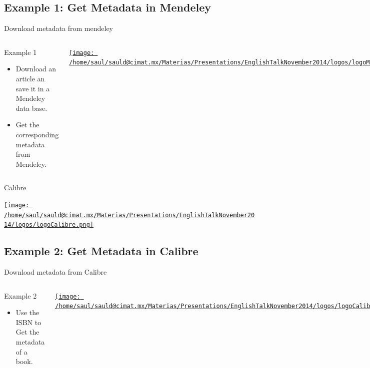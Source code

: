 \subsection{Example 1: Get Metadata in Mendeley}
	\begin{frame}{Download metadata from mendeley}
		\begin{columns}
				\begin{block}{Example 1}
					\begin{itemize}[<+-| alert@+>]
						\item Download an article an save it in a Mendeley data base.
						\item Get the corresponding metadata from Mendeley.
					\end{itemize}
				\end{block}
				\begin{center}
					\href{run:DOIMendeley.mp4}{
					\texttt{[image: /home/saul/sauld@cimat.mx/Materias/Presentations/EnglishTalkNovember2014/logos/logoMendeley.jpg]}
					}
				\end{center}
		\end{columns}
	\end{frame}
	\begin{frame}{Calibre}
		\begin{center}
			\href{run:calibre1.mp4}{
				\texttt{[image: /home/saul/sauld@cimat.mx/Materias/Presentations/EnglishTalkNovember2014/logos/logoCalibre.png]}
			}
		\end{center}
	\end{frame}
	\subsection{Example 2: Get Metadata in Calibre}
	\begin{frame}{Download metadata from Calibre}
		\begin{columns}
			\column{.5\textwidth}
				\begin{block}{Example 2}
					\begin{itemize}[<+-| alert@+>]
						\item Use the ISBN to Get the  metadata of a book.
					\end{itemize}
				\end{block}
			\column{.5\textwidth}
				\begin{center}
					\href{run:ISBNCalibre.mp4}{
					\texttt{[image: /home/saul/sauld@cimat.mx/Materias/Presentations/EnglishTalkNovember2014/logos/logoCalibre.png]}
					}
				\end{center}
		\end{columns}
	\end{frame}